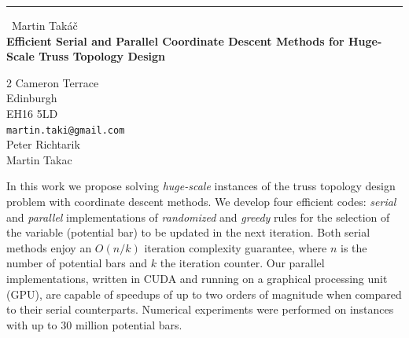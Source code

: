 \documentclass{report}
\begin{document}
\begin{center}
\rule{6in}{1pt} \
{\large Martin Tak\'{a}\v{c} \\
{\bf Efficient Serial and Parallel Coordinate Descent Methods for Huge-Scale Truss Topology Design}}

2 Cameron Terrace \\ Edinburgh \\ EH16 5LD
\\
{\tt martin.taki@gmail.com}\\
Peter Richtarik\\
Martin Takac\end{center}

In this work we propose solving \emph{huge-scale} instances of the truss
topology design problem with coordinate descent methods.
We develop four efficient codes: \emph{serial} and \emph{parallel}
implementations of \emph{randomized} and \emph{greedy} rules for the
selection of the variable (potential bar) to be updated in the next
iteration. Both serial methods enjoy an $O(n/k)$ iteration complexity
guarantee, where $n$ is the number of potential bars and $k$ the
iteration counter. Our parallel implementations, written in CUDA and
running on a graphical processing unit (GPU), are capable of speedups of
up to two orders of magnitude when compared to their serial counterparts.
Numerical experiments were performed on instances with up to 30 million
potential bars.
\end{document}

